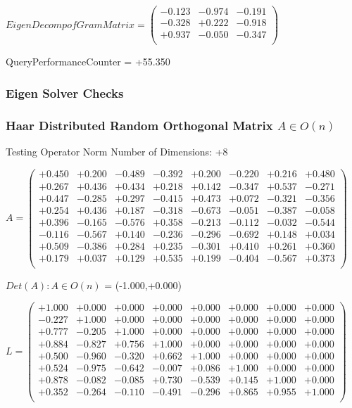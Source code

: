 \documentclass[9pt]{article}
\theoremstyle{plain}
\theoremstyle{definition}
\theoremstyle{remark}
\numberwithin{equation}{section}
\begin{document}
$EigenDecomp of Gram Matrix = \left(
\begin{array}{
ccc}
-0.123 & -0.974 & -0.191 \\
-0.328 & +0.222 & -0.918 \\
+0.937 & -0.050 & -0.347 \\
\end{array}
\right)$ \newline 

QueryPerformanceCounter  =  +55.350
\subsubsection{Eigen Solver Checks}
\subsubsection{Haar Distributed Random Orthogonal Matrix $A \in O(n)$}
 Testing Operator Norm
Number of Dimensions: +8

$A = \left(
\begin{array}{
cccccccc}
+0.450 & +0.200 & -0.489 & -0.392 & +0.200 & -0.220 & +0.216 & +0.480 \\
+0.267 & +0.436 & +0.434 & +0.218 & +0.142 & -0.347 & +0.537 & -0.271 \\
+0.447 & -0.285 & +0.297 & -0.415 & +0.473 & +0.072 & -0.321 & -0.356 \\
+0.254 & +0.436 & +0.187 & -0.318 & -0.673 & -0.051 & -0.387 & -0.058 \\
+0.396 & -0.165 & -0.576 & +0.358 & -0.213 & -0.112 & -0.032 & -0.544 \\
-0.116 & -0.567 & +0.140 & -0.236 & -0.296 & -0.692 & +0.148 & +0.034 \\
+0.509 & -0.386 & +0.284 & +0.235 & -0.301 & +0.410 & +0.261 & +0.360 \\
+0.179 & +0.037 & +0.129 & +0.535 & +0.199 & -0.404 & -0.567 & +0.373 \\
\end{array}
\right)$ \newline 

$Det(A) :   A \in O(n)$ = (-1.000,+0.000)

$L = \left(
\begin{array}{
cccccccc}
+1.000 & +0.000 & +0.000 & +0.000 & +0.000 & +0.000 & +0.000 & +0.000 \\
-0.227 & +1.000 & +0.000 & +0.000 & +0.000 & +0.000 & +0.000 & +0.000 \\
+0.777 & -0.205 & +1.000 & +0.000 & +0.000 & +0.000 & +0.000 & +0.000 \\
+0.884 & -0.827 & +0.756 & +1.000 & +0.000 & +0.000 & +0.000 & +0.000 \\
+0.500 & -0.960 & -0.320 & +0.662 & +1.000 & +0.000 & +0.000 & +0.000 \\
+0.524 & -0.975 & -0.642 & -0.007 & +0.086 & +1.000 & +0.000 & +0.000 \\
+0.878 & -0.082 & -0.085 & +0.730 & -0.539 & +0.145 & +1.000 & +0.000 \\
+0.352 & -0.264 & -0.110 & -0.491 & -0.296 & +0.865 & +0.955 & +1.000 \\
\end{array}
\right)$ \newline 
\end{document}
